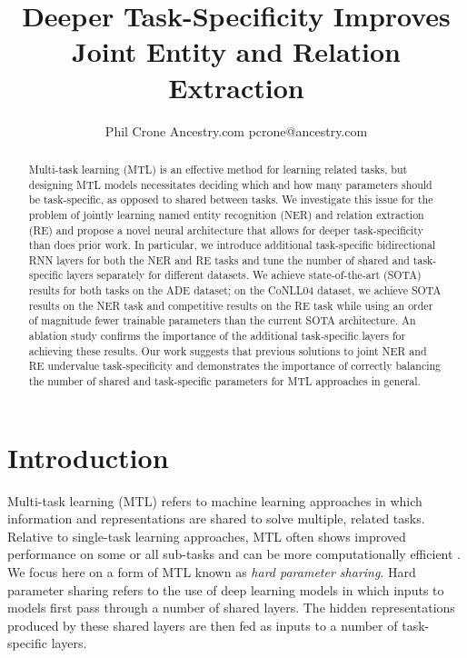 \documentclass{article}
\title{Deeper Task-Specificity Improves Joint Entity and Relation Extraction}
\author{
    Phil Crone
    \affiliations
    Ancestry.com
    \emails
    pcrone@ancestry.com
}
\begin{document}
\maketitle

\begin{abstract}
    Multi-task learning (MTL) is an effective method for learning related tasks, but designing MTL models necessitates deciding which and how many parameters should be task-specific, as opposed to shared between tasks. We investigate this issue for the problem of jointly learning named entity recognition (NER) and relation extraction (RE) and propose a novel neural architecture that allows for deeper task-specificity than does prior work. In particular, we introduce additional task-specific bidirectional RNN layers for both the NER and RE tasks and tune the number of shared and task-specific layers separately for different datasets. We achieve state-of-the-art (SOTA) results for both tasks on the ADE dataset; on the CoNLL04 dataset, we achieve SOTA results on the NER task and competitive results on the RE task while using an order of magnitude fewer trainable parameters than the current SOTA architecture. An ablation study confirms the importance of the additional task-specific layers for achieving these results. Our work suggests that previous solutions to joint NER and RE undervalue task-specificity and demonstrates the importance of correctly balancing the number of shared and task-specific parameters for MTL approaches in general. 
\end{abstract}

\section{Introduction}

Multi-task learning (MTL) refers to machine learning approaches in which information and representations are shared to solve multiple, related tasks. Relative to single-task learning approaches, MTL often shows improved performance on some or all sub-tasks and can be more computationally efficient \cite{caruana1997multitask,Cipolla_2018,vandenhende2019branched,li2019empirical}. We focus here on a form of MTL known as {\em hard parameter sharing}. Hard parameter sharing refers to the use of deep learning models in which inputs to models first pass through a number of shared layers. The hidden representations produced by these shared layers are then fed as inputs to a number of task-specific layers. 
\end{document}
